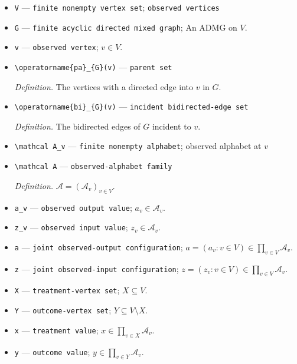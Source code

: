 \documentclass{article}
\begin{document}
\begin{itemize}
  \item \texttt{V} --- \texttt{finite nonempty vertex set}; \texttt{observed vertices}
  \item \texttt{G} --- \texttt{finite acyclic directed mixed graph}; An ADMG on \(V\).
  \item \texttt{v} --- \texttt{observed vertex}; \(v\in V\).
  \item \texttt{\textbackslash{}\allowbreak{}operatorname\{pa\}\allowbreak{}\_\allowbreak{}\{G\}\allowbreak{}(v)} --- \texttt{parent set}
  \par\smallskip\noindent\emph{Definition.} The vertices with a directed edge into \(v\) in \(G\).
  \item \texttt{\textbackslash{}\allowbreak{}operatorname\{bi\}\allowbreak{}\_\allowbreak{}\{G\}\allowbreak{}(v)} --- \texttt{incident bidirected-\allowbreak{}edge set}
  \par\smallskip\noindent\emph{Definition.} The bidirected edges of \(G\) incident to \(v\).
  \item \texttt{\textbackslash{}\allowbreak{}mathcal A\_\allowbreak{}v} --- \texttt{finite nonempty alphabet}; observed alphabet at \(v\)
  \item \texttt{\textbackslash{}\allowbreak{}mathcal A} --- \texttt{observed-\allowbreak{}alphabet family}
  \par\smallskip\noindent\emph{Definition.} \(\mathcal A=(\mathcal A_v)_{v\in V}\).
  \item \texttt{a\_\allowbreak{}v} --- \texttt{observed output value}; \(a_v\in\mathcal A_v\).
  \item \texttt{z\_\allowbreak{}v} --- \texttt{observed input value}; \(z_v\in\mathcal A_v\).
  \item \texttt{a} --- \texttt{joint observed-\allowbreak{}output configuration}; \(a=(a_v:v\in V)\in\prod_{v\in V}\mathcal A_v\).
  \item \texttt{z} --- \texttt{joint observed-\allowbreak{}input configuration}; \(z=(z_v:v\in V)\in\prod_{v\in V}\mathcal A_v\).
  \item \texttt{X} --- \texttt{treatment-\allowbreak{}vertex set}; \(X\subseteq V\).
  \item \texttt{Y} --- \texttt{outcome-\allowbreak{}vertex set}; \(Y\subseteq V\setminus X\).
  \item \texttt{x} --- \texttt{treatment value}; \(x\in\prod_{v\in X}\mathcal A_v\).
  \item \texttt{y} --- \texttt{outcome value}; \(y\in\prod_{v\in Y}\mathcal A_v\).

\end{itemize}
\end{document}
